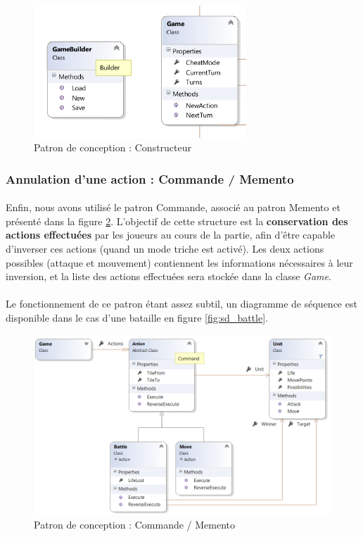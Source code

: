 \begin{figure}[h]
  \centering
  \includegraphics[width=8cm]{schemas/dp_builder.png}
  \caption{Patron de conception : Constructeur}
  \label{fig:builder}
\end{figure}

\subsubsection{Annulation d'une action : Commande / Memento}

\label{command}

\paragraph{}
Enfin, nous avons utilisé le patron Commande, associé au patron Memento et présenté dans la figure \ref{fig:command}.
L'objectif de cette structure est la \textbf{conservation des actions effectuées} par les joueurs au cours de la partie, afin d'être capable d'inverser ces actions (quand un mode triche est activé).
Les deux actions possibles (attaque et mouvement) contiennent les informations nécessaires à leur inversion, et la liste des actions effectuées sera stockée dans la classe \emph{Game}.

\paragraph{}
Le fonctionnement de ce patron étant assez subtil, un diagramme de séquence est disponible dans le cas d'une bataille en figure \ref{fig:sd_battle}.

\begin{figure}[h]
  \centering
  \includegraphics[width=13cm]{schemas/dp_command.png}
  \caption{Patron de conception : Commande / Memento}
  \label{fig:command}
\end{figure}

